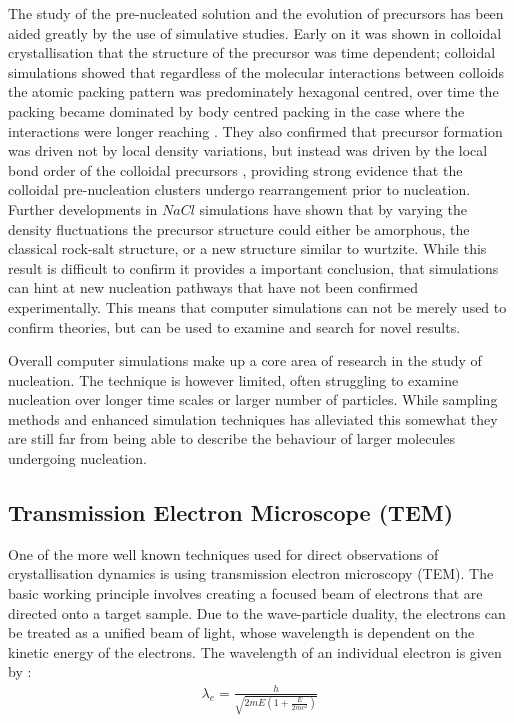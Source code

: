 The study of the pre-nucleated solution and the evolution of 
precursors has been aided greatly by the use of simulative 
studies. Early on it was shown in colloidal crystallisation 
that the structure of the precursor was time dependent; 
colloidal simulations showed that regardless of the molecular
interactions between colloids the atomic packing pattern was 
predominately hexagonal centred, over time the packing
became dominated by body centred packing in the case 
where the interactions were longer reaching \cite{Tan2013}. 
They also confirmed that precursor formation was driven not
by local density variations, but instead was driven by the 
local bond order of the colloidal precursors \cite{Tan2013}, 
providing strong evidence that the colloidal pre-nucleation 
clusters undergo rearrangement prior to nucleation. Further
developments in $NaCl$ simulations have shown that by varying
the density fluctuations the precursor structure could either
be amorphous, the classical rock-salt structure, or a new 
structure similar to wurtzite. While this result is difficult
to confirm it provides a important conclusion, that simulations
can hint at new nucleation pathways that have not been confirmed
experimentally. This means that computer simulations can not
be merely used to confirm theories, but can be used to examine
and search for novel results. 

Overall computer simulations make up a core area of research 
in the study of nucleation. The technique is however limited,
often struggling to examine nucleation over longer time scales
or larger number of particles. While sampling methods and 
enhanced simulation techniques has alleviated this somewhat 
they are still far from being able to describe the behaviour 
of larger molecules undergoing nucleation. 


\subsection{Transmission Electron Microscope (TEM)}
One of the more well known techniques used for direct observations 
of crystallisation dynamics is using transmission electron 
microscopy (TEM). The basic working principle involves creating a 
focused beam of electrons that are directed onto a target sample.
Due to the wave-particle duality, the electrons can be treated 
as a unified beam of light, whose wavelength is dependent on the 
kinetic energy of the electrons. The wavelength of an individual 
electron is given by \cite{Williams2009}:
\begin{align}
	\lambda_e = \frac{h}{\sqrt{2mE(1+\frac{E}{2mc^2})}}
\end{align}

